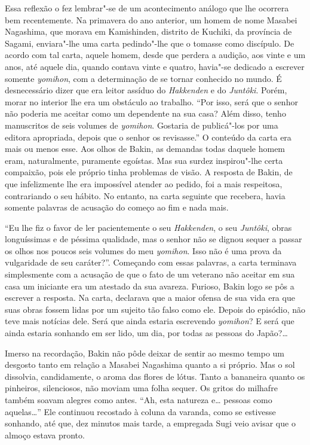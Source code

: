 Essa reflexão o fez lembrar"-se de um acontecimento análogo que lhe  
ocorrera bem recentemente. Na primavera do ano anterior, um homem de
nome Masabei Nagashima, que morava em Kamishinden, distrito de Kuchiki,
da província de Sagami, enviara"-lhe uma carta pedindo"-lhe que o tomasse
como discípulo. De acordo com tal carta, aquele homem, desde que
perdera a audição, aos vinte e um anos, até aquele dia, quando contava
vinte e quatro, havia"-se dedicado a escrever somente \textit{yomihon},
com a determinação de se tornar conhecido no mundo. É desnecessário
dizer que era leitor assíduo do \textit{Hakkenden} e do
\textit{Juntôki}. Porém, morar no interior lhe era um obstáculo ao
trabalho. ``Por isso, será que o senhor não poderia me aceitar como um
dependente na sua casa? Além disso, tenho manuscritos de seis volumes
de \textit{yomihon}. Gostaria de publicá"-los por uma editora
apropriada, depois que o senhor os revisasse.'' O conteúdo da carta era
mais ou menos esse. Aos olhos de Bakin, as demandas todas daquele homem
eram, naturalmente, puramente egoístas. Mas sua surdez inspirou"-lhe
certa compaixão, pois ele próprio tinha problemas de visão. A resposta
de Bakin, de que infelizmente lhe era impossível atender ao pedido, foi
a mais respeitosa, contrariando o seu hábito. No entanto, na carta
seguinte que recebera, havia somente palavras de acusação do começo ao
fim e nada mais.

``Eu lhe fiz o favor de ler pacientemente o seu \textit{Hakkenden}, o seu
\textit{Juntôki}, obras longuíssimas e de péssima qualidade, mas o
senhor não se dignou sequer a passar os olhos nos poucos seis volumes do meu \textit{yomihon}. 
Isso não é uma prova da vulgaridade de seu caráter?''. Começando com essas
palavras, a carta terminava simplesmente com a acusação de que o fato
de um veterano não aceitar em sua casa um iniciante era um atestado da
sua avareza. Furioso, Bakin logo se pôs a escrever a resposta. Na
carta, declarava que a maior ofensa de sua vida era que suas obras
fossem lidas por um sujeito tão falso como ele. Depois do episódio, não
teve mais notícias dele. Será que ainda estaria escrevendo
\textit{yomihon}? E será que ainda estaria sonhando em ser lido, um 
dia, por todas as pessoas do Japão?\ldots{}

Imerso na recordação, Bakin não pôde deixar de sentir ao mesmo tempo um
desgosto tanto em relação a Masabei Nagashima quanto a si próprio. Mas
o sol dissolvia, candidamente, o aroma das flores de lótus. Tanto a
bananeira quanto os pinheiros, silenciosos, não moviam uma folha
sequer. Os gritos do milhafre também soavam alegres como antes. ``Ah,
esta natureza e\ldots{} pessoas como aquelas\ldots{}'' Ele continuou recostado à
coluna da varanda, como se estivesse sonhando, até que, dez minutos
mais tarde, a empregada Sugi veio avisar que o almoço estava pronto.

